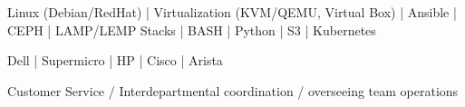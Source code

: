 
\begin{cvskills}

	\cvskill
	{}{Linux (Debian/RedHat) | Virtualization (KVM/QEMU, Virtual Box) | Ansible | CEPH | LAMP/LEMP Stacks | BASH | Python | S3 | Kubernetes}

	\cvskill
	{}{Dell | Supermicro | HP | Cisco | Arista }

	\cvskill
	{}{Customer Service / Interdepartmental coordination / overseeing team operations}

\end{cvskills}

